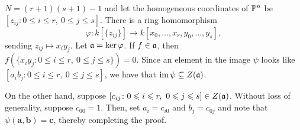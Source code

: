 \begin{exercise}
    $N = (r + 1)(s + 1) - 1$ and let the homogeneous coordinates of $\mathbb{P}^n$ be $[z_{ij}\colon 0\le i\le r,~0\le j\le s]$. There is a ring homomorphism 
    \begin{equation*}
    \varphi: k[\{z_{ij}\}]\to k[x_0,\dots,x_r,y_0,\dots,y_s],
    \end{equation*}
    sending $z_{ij}\mapsto x_iy_j$. Let $\mathfrak{a} = \ker\varphi$. If $f\in\mathfrak{a}$, then $f(\{x_iy_j\colon 0\le i\le r,~0\le j\le s\}) = 0$. Since an element in the image $\psi$ looks like $[a_ib_j\colon 0\le i\le r,~0\le j\le s]$, we have that $\operatorname{im}\psi\subseteq Z(\mathfrak{a})$.

    On the other hand, suppose $[c_{ij}\colon 0\leqslant i\leqslant r,~0\leqslant j\leqslant s]\in Z(\mathfrak{a})$. Without loss of generality, suppose $c_{00} = 1$. Then, set $a_i = c_{i0}$ and $b_j = c_{0j}$ and note that $\psi(\mathbf a,\mathbf b) = \mathbf c$, thereby completing the proof.
\end{exercise}